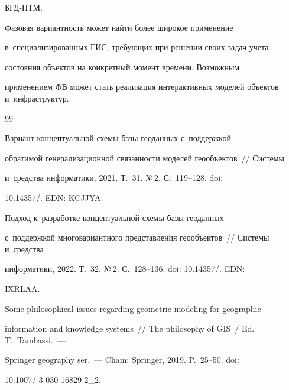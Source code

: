  БГД-ПТМ.


  


  Фазовая вариантность может найти более широкое применение 


  в~специализированных ГИС, тре\-бу\-ющих при решении своих задач учета 


состояния объектов на конкретный момент времени. Возможным 


применением ФВ может стать реализация интерактивных моделей объектов и~инфраструктур.








  {\small\frenchspacing


{%




\begin{thebibliography}{99}




 Вариант концептуальной схемы базы геоданных с~поддержкой 


обратимой генерализационной свя\-зан\-ности моделей геообъектов~/\!\!/ Сис\-те\-мы 


и~средства информатики, 2021. Т.~31. №\,2. С.~119--128. doi: 


10.14357\!/.  EDN: KCJJYA.




 Подход к~разработке концептуальной схемы базы геоданных 


с~поддержкой многовариантного пред\-став\-ле\-ния геообъектов~/\!\!/ Сис\-те\-мы и~средства 


информатики, 2022. Т.~32. №\,2. С.~128--136. doi: 10.14357\!/. EDN: 


IXRLAA.




 Some philosophical issues regarding geometric modeling for geographic 


information and knowledge systems~/\!\!/ The philosophy of GIS~/ Ed. T.~Tambassi.~--- 


Springer geography ser.~--- Cham: Springer, 2019. P.~25--50. doi:  


10.1007\!/-3-030-16829-2\_2.









\end{thebibliography}}}
